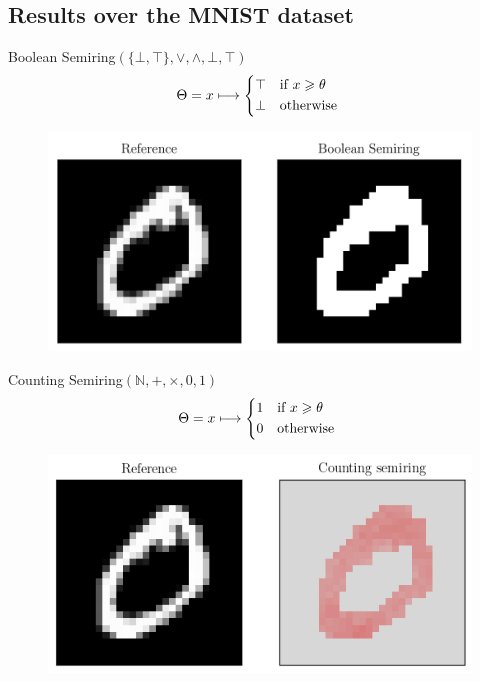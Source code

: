 \documentclass[aspectratio=169]{beamer}
\theoremstyle{definition}
\renewcommand{\geq}{\geqslant}
\begin{document}
\subsection{Results over the MNIST dataset}
\begin{frame}{Boolean Semiring}{\large $(\{\bot, \top\}, \lor, \land, \bot, \top)$}
    \begin{equation*}
        \Theta = x \longmapsto \begin{cases*}
            \top & if $x\geq\theta$\\
            \bot & otherwise
        \end{cases*}
    \end{equation*}

    \begin{figure}[H]
        \centering
        \includegraphics[width=.5\textwidth]{boolean.png}
    \end{figure}
\end{frame}


\begin{frame}{Counting Semiring}{\large $(\mathbb{N}, +, \times, 0, 1)$}
    \begin{equation*}
        \Theta = x \longmapsto \begin{cases*}
            1 & if $x\geq\theta$\\
            0 & otherwise
        \end{cases*}
    \end{equation*}

    \begin{figure}[H]
        \centering
        \includegraphics[width=.5\textwidth]{counting.png}
    \end{figure}
\end{frame}
\end{document}
